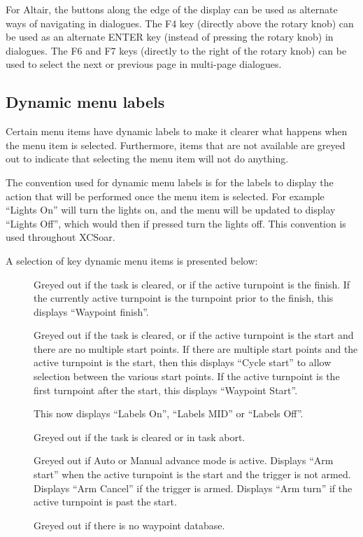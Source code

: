 For Altair, the buttons along the edge of the display can be used as
alternate ways of navigating in dialogues.  The F4 key (directly above
the rotary knob) can be used as an alternate ENTER key (instead of
pressing the rotary knob) in dialogues.  The F6 and F7 keys (directly to
the right of the rotary knob) can be used to select the next or
previous page in multi-page dialogues.

\subsection*{Dynamic menu labels}
Certain menu items have dynamic labels to make it clearer what happens when the
menu item is selected.  Furthermore, items that are not available are greyed
out to indicate that selecting the menu item will not do anything.

The convention used for dynamic menu labels is for the labels to display the
action that will be performed once the menu item is selected. For example 
``Lights On'' will turn the lights on, and the menu will be updated to display
``Lights Off'', which would then if pressed turn the lights off. This
convention is used throughout XCSoar.

A selection of key dynamic menu items is presented below:
\begin{description}
\item[]  
  Greyed out if the task is cleared, or if the active turnpoint is the
  finish. If the currently active turnpoint is the turnpoint prior to the finish, this displays  ``Waypoint finish''.
\item[]  
  Greyed out if the task is cleared, or if the active turnpoint is the
  start and there are no multiple start points.  If there are multiple
  start points and the active turnpoint is the start, then this
  displays ``Cycle start'' to allow selection between the various
  start points.  If the active turnpoint is the first turnpoint after the start, this displays ``Waypoint Start''.
\item[]  
  This now displays ``Labels On'', ``Labels MID'' or ``Labels Off''.
\item[]  
  Greyed out if the task is cleared or in task abort.
\item[]  
  Greyed out if Auto or Manual advance mode is active.  Displays ``Arm
  start'' when the active turnpoint is the start and the trigger is
  not armed.  Displays ``Arm Cancel'' if the trigger is armed.
  Displays ``Arm turn'' if the active turnpoint is past the start.
\item[]
  Greyed out if there is no waypoint database.
\end{description}

